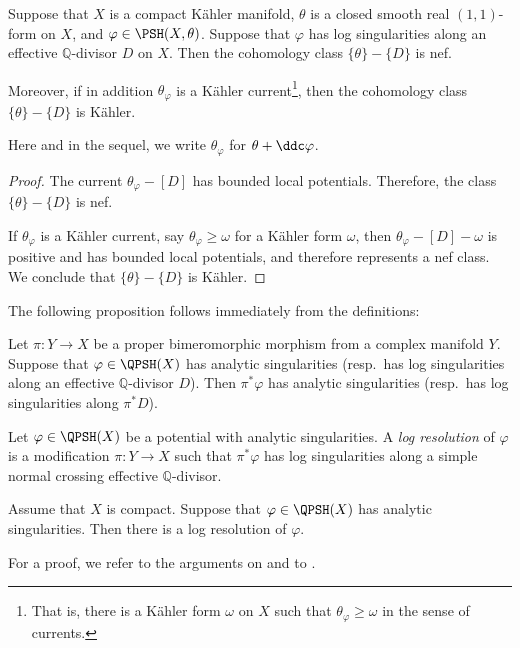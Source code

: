 \begin{lemma}\label{lma:logsingrem}
    Suppose that $X$ is a compact Kähler manifold, $\theta$ is a closed smooth real $(1,1)$-form on $X$, and $\varphi\in \PSH(X,\theta)$. Suppose that $\varphi$ has log singularities along an effective $\mathbb{Q}$-divisor $D$ on $X$. Then the cohomology class $\{\theta\}-\{D\}$ is nef.

    Moreover, if in addition $\theta_{\varphi}$ is a Kähler current\footnote{That is, there is a K\"ahler form $\omega$ on $X$ such that $\theta_{\varphi}\geq \omega$ in the sense of currents.}, then the cohomology class $\{\theta\}-\{D\}$ is Kähler.
\end{lemma}
Here and in the sequel, we write $\theta_{\varphi}$ for $\theta+\ddc\varphi$.

\begin{proof}
    The current $\theta_{\varphi}-[D]$ has bounded local potentials. Therefore, the class $\{\theta\}-\{D\}$ is nef.

    If $\theta_{\varphi}$ is a Kähler current, say $\theta_{\varphi}\geq \omega$ for a Kähler form $\omega$, then $\theta_{\varphi}-[D]-\omega$ is positive and has bounded local potentials, and therefore represents a nef class. We conclude that $\{\theta\}-\{D\}$ is Kähler.
\end{proof}

The following proposition follows immediately from the definitions:
\begin{proposition}\label{prop:pshfunctions:L1425}
    Let $\pi\colon Y\rightarrow X$ be a proper bimeromorphic morphism from a complex manifold $Y$.
    Suppose that $\varphi\in \QPSH(X)$ has analytic singularities (resp.\ has log singularities along an effective $\mathbb{Q}$-divisor $D$).
    Then $\pi^*\varphi$ has analytic singularities (resp.\ has log singularities along $\pi^*D$).
\end{proposition}

\begin{definition}\label{def:logres}
    Let $\varphi\in \QPSH(X)$ be a potential with analytic singularities.
    A \emph{log resolution} of $\varphi$ is a modification $\pi\colon Y\rightarrow X$ such that $\pi^*\varphi$ has log singularities along a simple normal crossing effective $\mathbb{Q}$-divisor.
\end{definition}

\begin{theorem}\label{thm:resolvelogsing}
    Assume that $X$ is compact.
    Suppose that $\varphi\in \QPSH(X)$ has analytic singularities. Then there is a log resolution of $\varphi$.
\end{theorem}
For a proof, we refer to the arguments on \cite[Page~104]{MM07} and to \cite[Proposition~13.1.10]{FPT}.


